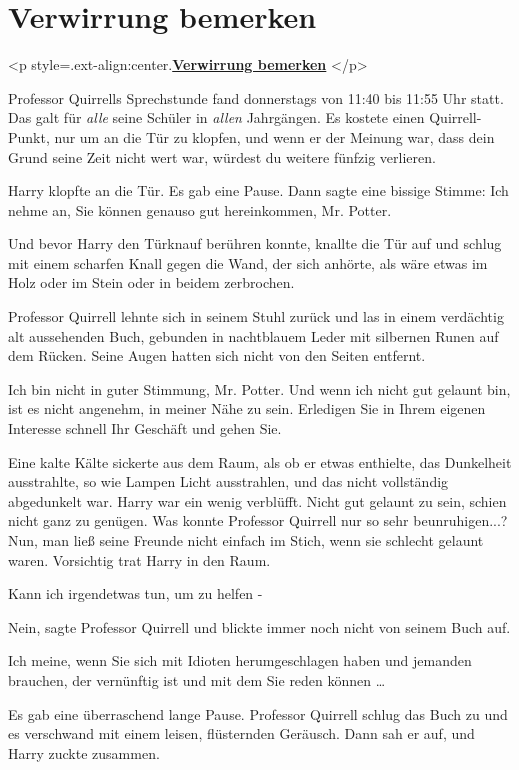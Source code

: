 
\chapter{Verwirrung bemerken}


		<p style=\grqq{}.ext-align:center\grqq{}.\textbf{\underline{Verwirrung
		bemerken} }</p>

Professor Quirrells Sprechstunde fand donnerstags von 11:40 bis 11:55 Uhr statt.
Das galt für \emph{alle} seine Schüler in \emph{allen} Jahrgängen. Es kostete
einen Quirrell-Punkt, nur um an die Tür zu klopfen, und wenn er der Meinung war,
dass dein Grund seine Zeit nicht wert war, würdest du weitere fünfzig verlieren.

Harry klopfte an die Tür. Es gab eine Pause. Dann sagte eine bissige Stimme:
\glqq{}Ich nehme an, Sie können genauso gut hereinkommen, Mr. Potter.\grqq{}

Und bevor Harry den Türknauf berühren konnte, knallte die Tür auf und schlug mit
einem scharfen Knall gegen die Wand, der sich anhörte, als wäre etwas im Holz
oder im Stein oder in beidem zerbrochen.

Professor Quirrell lehnte sich in seinem Stuhl zurück und las in einem
verdächtig alt aussehenden Buch, gebunden in nachtblauem Leder mit silbernen
Runen auf dem Rücken. Seine Augen hatten sich nicht von den Seiten entfernt.

\glqq{}Ich bin nicht in guter Stimmung, Mr. Potter. Und wenn ich nicht gut
gelaunt bin, ist es nicht angenehm, in meiner Nähe zu sein. Erledigen Sie in
Ihrem eigenen Interesse schnell Ihr Geschäft und gehen Sie.\grqq{}

Eine kalte Kälte sickerte aus dem Raum, als ob er etwas enthielte, das
Dunkelheit ausstrahlte, so wie Lampen Licht ausstrahlen, und das nicht
vollständig abgedunkelt war. Harry war ein wenig verblüfft. Nicht gut gelaunt zu
sein, schien nicht ganz zu genügen. Was konnte Professor Quirrell nur so sehr
beunruhigen...? Nun, man ließ seine Freunde nicht einfach im Stich, wenn sie
schlecht gelaunt waren. Vorsichtig trat Harry in den Raum.

\glqq{}Kann ich irgendetwas tun, um zu helfen -\grqq{}

\glqq{}Nein\grqq{}, sagte Professor Quirrell und blickte immer noch nicht von
seinem Buch auf.

\glqq{}Ich meine, wenn Sie sich mit Idioten herumgeschlagen haben und jemanden
brauchen, der vernünftig ist und mit dem Sie reden können …\grqq{}

Es gab eine überraschend lange Pause. Professor Quirrell schlug das Buch zu und
es verschwand mit einem leisen, flüsternden Geräusch. Dann sah er auf, und Harry
zuckte zusammen.

